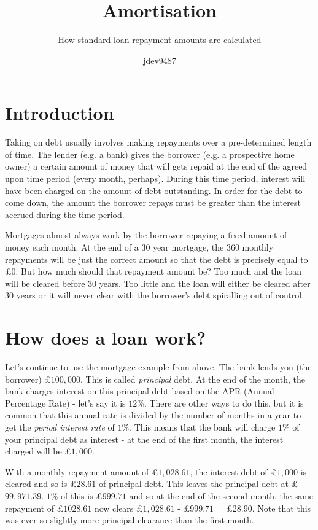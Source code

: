\documentclass[]{scrartcl}
\author{jdev9487}
\title{Amortisation}
\subtitle{How standard loan repayment amounts are calculated}
\theoremstyle{definition}
\begin{document}
\maketitle

\tableofcontents

\section{Introduction}
Taking on debt usually involves making repayments over a pre-determined length of time. The lender (e.g. a bank) gives the borrower (e.g. a prospective home owner) a certain amount of money that will gets repaid at the end of the agreed upon time period (every month, perhaps). During this time period, interest will have been charged on the amount of debt outstanding. In order for the debt to come down, the amount the borrower repays must be greater than the interest accrued during the time period.

Mortgages almost always work by the borrower repaying a fixed amount of money each month. At the end of a 30 year mortgage, the 360 monthly repayments will be just the correct amount so that the debt is precisely equal to £0. But how much should that repayment amount be? Too much and the loan will be cleared before 30 years. Too little and the loan will either be cleared after 30 years or it will never clear with the borrower's debt spiralling out of control.

\section{How does a loan work?}
Let's continue to use the mortgage example from above. The bank lends you (the borrower) £$100,000$. This is called \textit{principal} debt. At the end of the month, the bank charges interest on this principal debt based on the APR (Annual Percentage Rate) - let's say it is $12$\%. There are other ways to do this, but it is common that this annual rate is divided by the number of months in a year to get the \textit{period interest rate} of $1$\%. This means that the bank will charge $1$\% of your principal debt as interest - at the end of the first month, the interest charged will be £$1,000$.

With a monthly repayment amount of £$1,028.61$, the interest debt of £$1,000$ is cleared and so is £$28.61$ of principal debt. This leaves the principal debt at £$99, 971.39$. $1$\% of this is £$999.71$ and so at the end of the second month, the same repayment of £$1028.61$ now clears £$1,028.61$ - £$999.71$ = £$28.90$. Note that this was ever so slightly more principal clearance than the first month.
\end{document}
